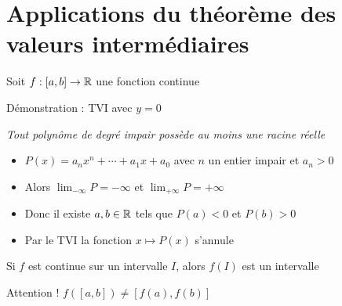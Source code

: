 \section{Applications du théorème des valeurs intermédiaires}

\begin{frame}

\begin{corollaire}
Soit $f:[a,b]\to\mathbb{R}$ une fonction continue
 
 \pause
\mybox{Si $f(a)\cdot f(b)<0$, alors il existe $c\in]a,b[$ tel que $f(c)=0$}
\end{corollaire}

\pause
Démonstration : TVI avec $y=0$

\pause
{} 
 
\end{frame}



\begin{frame}

\hfill \emph{Tout polynôme de degré impair possède au moins une racine réelle}

\vspace*{-3ex}
\begin{itemize}
\item\pause $P(x)=a_nx^n+\cdots+a_1x+a_0$ avec $n$ un entier impair et $a_n>0$
\item\pause Alors 
$\displaystyle\lim_{-\infty} P = -\infty$ et $\displaystyle\lim_{+\infty} P = +\infty$
\item\pause Donc il existe $a,  b\in \mathbb{R}$ tels que $P(a)<0$ et $P(b)>0$
\item\pause Par le TVI la fonction $x\mapsto P(x)$ s'annule
\end{itemize}

  
\end{frame}



\begin{frame}

\begin{corollaire}
Si $f$ est continue sur un intervalle $I$, alors $f(I)$ est un intervalle
\end{corollaire}

\pause

Attention ! $f\left([a,b]\right) \neq [f(a),f(b)]$

\pause

\end{frame}



